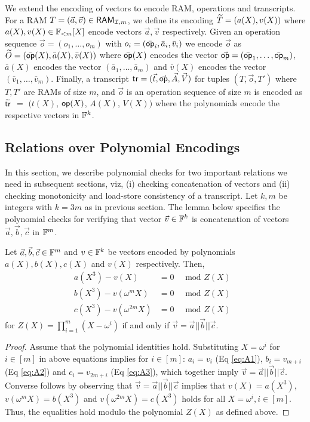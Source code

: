 We extend the encoding of vectors to encode RAM, operations and transcripts.
For a RAM $T=(\vec{a},\vec{v})\in \mathsf{RAM}_{\mathcal{I}, {m}}$, we define its encoding
$\widetilde{T}=(a(X),v(X))$ where $a(X),v(X)\in \mathbb{F}_{<m}[X]$ encode vectors $\vec{a}, \vec{v}$ respectively.
Given an operation sequence
$\vec{o}=(o_1,\ldots,o_m)$ with $o_i=(\bar{\mathsf{op}}_i,\bar{a}_i,\bar{v}_i)$ we encode $\vec{o}$ as $\widetilde{O}=(\bar{\mathsf{op}}(X),\bar{a}(X),\bar{v}(X))$
where $\bar{\mathsf{op}}(X)$ encodes the
vector $\vec{\mathsf{op}}=(\bar{\mathsf{op}}_1,\ldots,\bar{\mathsf{op}}_m)$, $\bar{a}(X)$ encodes the vector $(\bar{a}_1,\ldots,\bar{a}_m)$ and $\bar{v}(X)$
encodes the vector $(\bar{v}_1,\ldots,\bar{v}_m)$.
Finally, a transcript $\mathsf{tr}=(\vec{t},\vec{\mathsf{op}},\vec{A},\vec{V})$ for tuples $(T,\vec{o},T')$ where $T,T'$ are RAMs of size $m$, and $\vec{o}$ is an
operation sequence of size $m$ is encoded as $\widetilde{\mathsf{tr}}$ $=$ $(t(X)$, $\mathsf{op}(X)$, $A(X)$, $V(X))$ where the polynomials
encode the respective vectors in $\mathbb{F}^k$.

\subsection{Relations over Polynomial Encodings}\label{subsec:encoded-relations}
In this section, we describe polynomial checks for two important relations we need in subsequent sections, viz,
(i) checking concatenation of vectors and (ii) checking monotonicity and load-store consistency of a transcript. Let
$k,m$ be integers with $k=3m$ as in previous section. The lemma below specifies the polynomial checks for verifying
that vector $\vec{v}\in \mathbb{F}^k$ is concatenation of vectors $\vec{a},\vec{b},\vec{c}$ in $\mathbb{F}^m$.

\begin{lemma}\label{lem:vec-concatenation}
Let $\vec{a},\vec{b},\vec{c}\in \mathbb{F}^m$  and $v\in \mathbb{F}^k$ be vectors encoded by polynomials
$a(X),b(X),c(X)$ and $v(X)$ respectively. Then,
    {\small
\begin{align}
    a(X^3) - v(X)  &= 0  \quad \text{ mod $Z(X)$ } \tag{A1}\label{eq:A1}\\
    b(X^3) - v(\omega^m X)  &= 0   \quad \text{ mod $Z(X)$ } \tag{A2}\label{eq:A2}\\
    c(X^3) - v(\omega^{2m} X) &= 0 \quad \text{ mod $Z(X)$ } \tag{A3}\label{eq:A3}
\end{align}
}
for $Z(X)=\prod_{i=1}^m (X-\omega^i)$ if and only if $\vec{v}=\vec{a}||\vec{b}||\vec{c}$.
\end{lemma}
\begin{proof}
    Assume that the polynomial identities hold. Substituting $X=\omega^i$ for $i\in [m]$ in above equations implies
    for $i\in [m]$: $a_i=v_i$ (Eq \eqref{eq:A1}), $b_i=v_{m+i}$ (Eq \eqref{eq:A2}) and $c_i=v_{2m+i}$ (Eq \eqref{eq:A3}),
    which together imply $\vec{v}=\vec{a}||\vec{b}||\vec{c}$. Converse follows by observing that $\vec{v}=\vec{a}||\vec{b}||\vec{c}$
    implies that $v(X) = a(X^3)$, $v(\omega^m X)=b(X^3)$ and $v(\omega^{2m} X)=c(X^3)$ holds for all $X=\omega^i, i\in [m]$.
    Thus, the equalities hold modulo the polynomial $Z(X)$ as defined above.
\end{proof}

